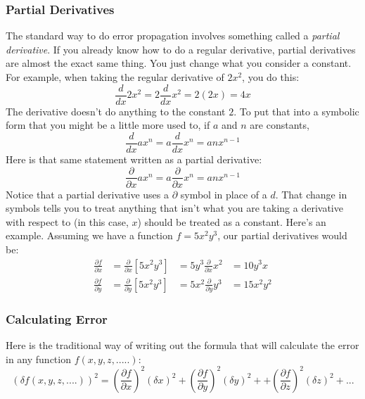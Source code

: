 \documentclass[twoside,11pt,ShortChapTitles]{BYUTextbook}
\begin{document}
\subsubsection{Partial Derivatives}
The standard way to do error propagation involves something called a {\em partial derivative}.  If you already know how to do a regular derivative, partial derivatives are almost the exact same thing.  You just change what you consider a constant.  For example,  when taking the regular derivative of $2x^2$, you do this:
\[\frac{d}{dx}2x^2 = 2\frac{d}{dx}x^2 = 2\left(2x\right) = 4x\]
The derivative doesn't do anything to the constant $2$.  To put that into a symbolic form that you might be a little more used to, if $a$ and $n$ are constants,
\[\frac{d}{dx} ax^n = a\frac{d}{dx}x^n = anx^{n-1}\]
Here is that same statement written as a partial derivative:
\[\frac{\partial}{\partial x} ax^n = a\frac{\partial}{\partial x}x^n = anx^{n-1}
\]
 Notice that a partial derivative uses a $\partial$ symbol in place of a $d$. That change in symbols tells you to treat anything that isn't what you are taking a derivative with respect to (in this case, $x$) should be treated as a constant.  Here's an example.  Assuming we have a function $f=5x^2y^3$, our partial derivatives would be:
 \[\begin{aligned}
 \frac{\partial f}{\partial x} &= \frac{\partial}{\partial x}\left[5x^2y^3\right] & = 5y^3\frac{\partial}{\partial x}x^2 &= 10y^3x \\
  \frac{\partial f}{\partial y} &= \frac{\partial}{\partial y}\left[5x^2y^3\right] & = 5x^2\frac{\partial}{\partial y}y^3 &= 15x^2y^2
 \end{aligned}\]

 \subsubsection{Calculating Error}
 Here is the traditional way of writing out the formula that will calculate the error in any function $f(x,y,z,.....)$:
 \[
 \left(\delta f(x,y,z,....)\right)^2 = \left(\frac{\partial f}{\partial x}\right)^2(\delta x)^2+ \left(\frac{\partial f}{\partial y}\right)^2(\delta y)^2++ \left(\frac{\partial f}{\partial z}\right)^2(\delta z)^2+...
 \]
\end{document}
